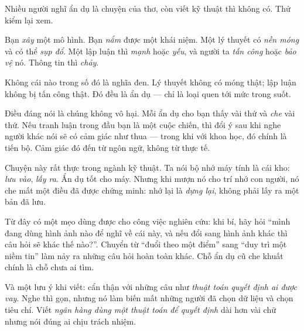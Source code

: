 \documentclass[../../english.tex]{subfiles}
\begin{document}
\begin{dongian}
Nhiều người nghĩ ẩn dụ là chuyện của thơ, còn viết kỹ thuật thì không có. Thử kiểm lại xem.

Bạn \emph{xây} một mô hình. Bạn \emph{nắm} được một khái niệm. Một lý thuyết có \emph{nền móng} và có thể \emph{sụp đổ}. Một lập luận thì \emph{mạnh} hoặc \emph{yếu}, và người ta \emph{tấn công} hoặc \emph{bảo vệ} nó. Thông tin thì \emph{chảy}.

Không cái nào trong số đó là nghĩa đen. Lý thuyết không có móng thật; lập luận không bị tấn công thật. Đó đều là ẩn dụ --- chỉ là loại quen tới mức trong suốt.

Điều đáng nói là chúng không vô hại. Mỗi ẩn dụ cho bạn thấy vài thứ và \emph{che} vài thứ. Nếu tranh luận trong đầu bạn là một cuộc chiến, thì đổi ý sau khi nghe người khác nói sẽ có cảm giác như thua --- trong khi với khoa học, đó chính là tiến bộ. Cảm giác đó đến từ ngôn ngữ, không từ thực tế.

Chuyện này rất thực trong ngành kỹ thuật. Ta nói bộ nhớ máy tính là cái kho: \emph{lưu vào}, \emph{lấy ra}. Ẩn dụ tốt cho máy. Nhưng khi mượn nó cho trí nhớ con người, nó che mất một điều đã được chứng minh: nhớ lại là \emph{dựng lại}, không phải lấy ra một bản đã lưu.

Từ đây có một mẹo dùng được cho công việc nghiên cứu: khi bí, hãy hỏi ``mình đang dùng hình ảnh nào để nghĩ về cái này, và nếu đổi sang hình ảnh khác thì câu hỏi sẽ khác thế nào?''. Chuyển từ ``đuổi theo một điểm'' sang ``duy trì một niềm tin'' làm nảy ra những câu hỏi hoàn toàn khác. Chỗ ẩn dụ cũ che khuất chính là chỗ chưa ai tìm.

Và một lưu ý khi viết: cẩn thận với những câu như \emph{thuật toán quyết định ai được vay}. Nghe thì gọn, nhưng nó làm biến mất những người đã chọn dữ liệu và chọn tiêu chí. Viết \emph{ngân hàng dùng một thuật toán để quyết định} dài hơn vài chữ nhưng nói đúng ai chịu trách nhiệm.
\end{dongian}
\end{document}
